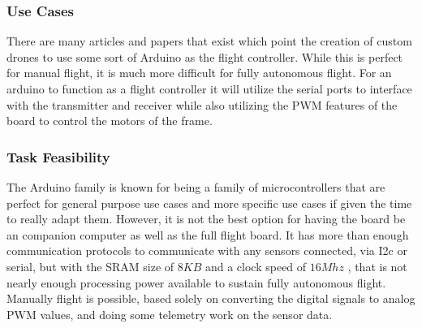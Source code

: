 \documentclass[conference,12pt, ]{IEEEtran}
\begin{document}
\subsubsection{Use Cases}
There are many articles and papers that exist which point the creation of custom drones to use some sort of Arduino as the flight controller. While this is perfect for manual flight, it is much more difficult for fully autonomous flight. For an arduino to function as a flight controller it will utilize the serial ports to interface with the transmitter and receiver while also utilizing the PWM features of the board to control the motors of the frame. 
\subsubsection{Task Feasibility}
The Arduino family is known for being a family of microcontrollers that are perfect for general purpose use cases and more specific use cases if given the time to really adapt them. However, it is not the best option for having the board be an companion computer as well as the full flight board. It has more than enough communication protocols to communicate with any sensors connected, via I2c or serial, but with the SRAM size of $8KB$ and a clock speed of $16Mhz$ \cite{arduino}, that is not nearly enough processing power available to sustain fully autonomous flight. Manually flight is possible, based solely on converting the digital signals to analog PWM values, and doing some telemetry work on the sensor data. 
\end{document}
